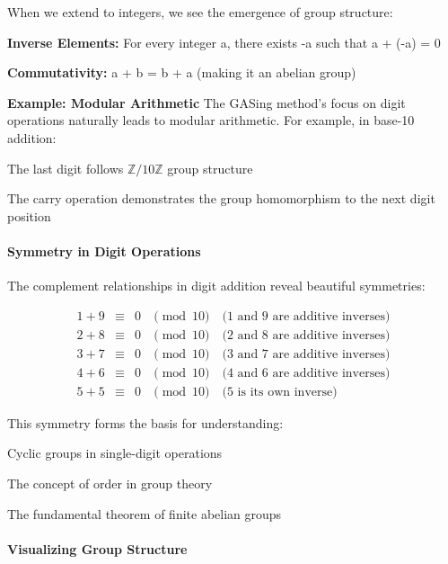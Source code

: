 When we extend to integers, we see the emergence of group structure:


\noindent\textbf{\textbf{Inverse Elements}:} For every integer a, there exists -a such that a + (-a) = 0


\noindent\textbf{\textbf{Commutativity}:} a + b = b + a (making it an abelian group)


\textbf{Example: Modular Arithmetic}
The GASing method's focus on digit operations naturally leads to modular arithmetic. For example, in base-10 addition:

\noindent The last digit follows $\mathbb{Z}/10\mathbb{Z}$ group structure


\noindent The carry operation demonstrates the group homomorphism to the next digit position

\paragraph{Symmetry in Digit Operations}

The complement relationships in digit addition reveal beautiful symmetries:

$$
\begin{array}{rcll}
1 + 9 &\equiv& 0 &\pmod{10} \quad \text{($1$ and $9$ are additive inverses)} \\
2 + 8 &\equiv& 0 &\pmod{10} \quad \text{($2$ and $8$ are additive inverses)} \\
3 + 7 &\equiv& 0 &\pmod{10} \quad \text{($3$ and $7$ are additive inverses)} \\
4 + 6 &\equiv& 0 &\pmod{10} \quad \text{($4$ and $6$ are additive inverses)} \\
5 + 5 &\equiv& 0 &\pmod{10} \quad \text{($5$ is its own inverse)}
\end{array}
$$

This symmetry forms the basis for understanding:

\noindent Cyclic groups in single-digit operations


\noindent The concept of order in group theory


\noindent The fundamental theorem of finite abelian groups

\paragraph{Visualizing Group Structure}

